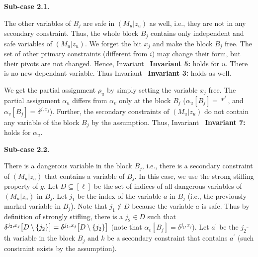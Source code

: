 \documentclass[10pt,a4paper]{article}
\begin{document}
\par\medskip\noindent\textbf{Sub-case 2.1.}\par




The other variables of $B_{j}$ are safe in $(M_{u}|z_{u})$ as well, i.e., they are not in any secondary constraint.
Thus, the whole block $B_{j}$ contains only independent and safe variables of $(M_{u}|z_{u})$.
We forget the bit $x_{j}$ and make the block $B_{j}$ free.
The set of other primary constraints (different from $i$) may change their form, but their pivots are not changed. Hence, Invariant \textbf{ Invariant 5:} holds for $u$.
There is no new dependant variable. Thus Invariant \textbf{ Invariant 3:} holds as well.\par




We get the partial assignment $\rho_{u}$ by simply setting the variable $x_{j}$ free.
The partial assignment $\alpha_{u}$ differs from $\alpha_{v}$ only at the block $B_{j}$ ($\alpha_{u}[B_{j}]=*^{\ell}$, and $\alpha_{v}[B_{j}]=\delta^{j,x_{j}}$).
Further, the secondary constraints of $(M_{u}|z_{u})$ do not contain any variable of the block $B_{j}$ by the assumption.
Thus, Invariant \textbf{ Invariant 7:} holds for $\alpha_{u}$.\par





\par\medskip\noindent\textbf{Sub-case 2.2.}\par




There is a dangerous variable in the block $B_{j}$, i.e., there is a secondary constraint of $(M_{u}|z_{u})$ that contains a variable of $B_{j}$.
In this case, we use the strong stifling property of $g$.
Let $D\subseteq[\ell]$ be the set of indices of all dangerous variables of $(M_{u}|z_{u})$ in $B_{j}$.
Let $j_{1}$ be the index of the variable $a$ in $B_{j}$ (i.e., the previously marked variable in $B_{j}$).
Note that $j_{1}\not\in D$ because the variable $a$ is safe.
Thus by definition of strongly stifling, there is a $j_{2}\in D$ such that $\delta^{j_{2},x_{j}}\bigl{[}D\setminus\{j_{2}\}\bigr{]}=\delta^{j_{1},x_{j}}%
\bigl{[}D\setminus\{j_{2}\}\bigr{]}$ (note that $\alpha_{v}[B_{j}]=\delta^{j_{1},x_{j}}$).
Let $a^{\prime}$ be the $j_{2}$-th variable in the block $B_{j}$ and $k$ be a secondary constraint that contains $a^{\prime}$ (such constraint exists by the assumption).\par
\end{document}
